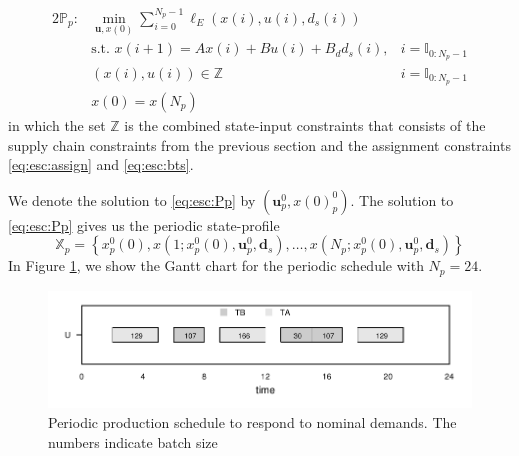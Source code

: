\documentclass{elsarticle}
\newcommand{\bu}{\mathbf{u}}
\newcommand{\bd}{\mathbf{d}}
\newcommand{\set}[1]{\left\lbrace #1 \right\rbrace}
\theoremstyle{definition}
\begin{document}
 
\begin{alignat}{2}
\label{eq:esc:Pp}
\mathbb{P}_p:& \min_{\bu,x(0)}{\sum_{i=0}^{N_p-1}\ell_E(x(i),u(i),d_s(i))}& \nonumber \\
&\text{s.t.~} x(i+1) = Ax(i) + Bu(i)+B_dd_s(i),&i = \mathbb{I}_{0:N_p-1} \\
&(x(i),u(i)) \in \mathbb{Z}&i = \mathbb{I}_{0:N_p-1}\nonumber\\
& x(0) = x(N_p)& \nonumber
\end{alignat}
in which the set $\mathbb{Z}$ is the combined state-input constraints that consists of the supply chain constraints from the previous section and the assignment constraints \eqref{eq:esc:assign} and \eqref{eq:esc:bts}. 

 We denote the solution to
\eqref{eq:esc:Pp} by $(\mathbf{u}_p^0,x(0)_p^0)$.
The solution to \eqref{eq:esc:Pp} gives us the periodic state-profile
\begin{equation}
\label{eq:esc:Xperiodic}
\mathbb{X}_p =  \set {x^0_p(0),x(1;x^0_p(0),\bu_p^0,\bd_s),\ldots,x(N_p;x^0_p(0),\bu_p^0,\bd_s) }
\end{equation}
In Figure \ref{fig:esc:gantt_ss}, we show the Gantt chart for the periodic
schedule with $N_p = 24$.
\begin{figure}
\label{fig:esc:gantt_ss}
\centering
\scriptsize
\centering
\includegraphics{SS_gantt.pdf}
\caption{Periodic production schedule to respond to nominal
  demands. The numbers indicate batch size}
\end{figure}
\end{document}
